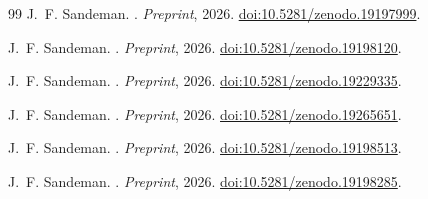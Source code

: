 \documentclass[11pt,a4paper]{article}
\begin{document}
\begin{thebibliography}{99}
J.~F. Sandeman.
.
\newblock \textit{Preprint}, 2026.
\newblock \href{https://doi.org/10.5281/zenodo.19197999}{doi:10.5281/zenodo.19197999}.

J.~F. Sandeman.
.
\newblock \textit{Preprint}, 2026.
\newblock \href{https://doi.org/10.5281/zenodo.19198120}{doi:10.5281/zenodo.19198120}.

J.~F. Sandeman.
.
\newblock \textit{Preprint}, 2026.
\newblock \href{https://doi.org/10.5281/zenodo.19229335}{doi:10.5281/zenodo.19229335}.

J.~F. Sandeman.
.
\newblock \textit{Preprint}, 2026.
\newblock \href{https://doi.org/10.5281/zenodo.19265651}{doi:10.5281/zenodo.19265651}.

J.~F. Sandeman.
.
\newblock \textit{Preprint}, 2026.
\newblock \href{https://doi.org/10.5281/zenodo.19198513}{doi:10.5281/zenodo.19198513}.

J.~F. Sandeman.
.
\newblock \textit{Preprint}, 2026.
\newblock \href{https://doi.org/10.5281/zenodo.19198285}{doi:10.5281/zenodo.19198285}.

\end{thebibliography}
\end{document}

